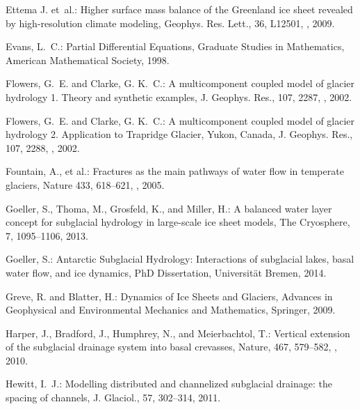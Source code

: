 \documentclass[gmd]{copernicus}   %
\begin{document}
\begin{thebibliography}{68}
Ettema J. et~al.: Higher surface mass balance of the Greenland ice sheet
  revealed by high-resolution climate modeling, Geophys. Res. Lett., 36, L12501,
  , 2009.

Evans, L.~C.: Partial {D}ifferential {E}quations, Graduate Studies in
  Mathematics, American Mathematical Society, 1998.

Flowers, G.~E. and Clarke, G. K.~C.: A multicomponent coupled model of glacier
  hydrology 1. {T}heory and synthetic examples, J. Geophys. Res., 107, 2287,
  , 2002{}.

Flowers, G.~E. and Clarke, G. K.~C.: A multicomponent coupled model of glacier
  hydrology 2. {A}pplication to {T}rapridge {G}lacier, {Y}ukon, {C}anada, J.
  Geophys. Res., 107, 2288, , 2002{}.

Fountain, A., et al.: Fractures as the main pathways of water flow in temperate glaciers, Nature 433, 618--621, , 2005.

Goeller, S., Thoma, M., Grosfeld, K., and Miller, H.: A balanced water layer
  concept for subglacial hydrology in large-scale ice sheet models, The
  Cryosphere, 7, 1095--1106, 2013.

Goeller, S.: Antarctic {S}ubglacial {H}ydrology: {I}nteractions of subglacial lakes, basal water flow, and ice dynamics, PhD Dissertation, Universit\"at Bremen, 2014.

Greve, R. and Blatter, H.: Dynamics of {I}ce {S}heets and {G}laciers, Advances
  in Geophysical and Environmental Mechanics and Mathematics, Springer, 2009.

Harper, J., Bradford, J., Humphrey, N., and Meierbachtol, T.: Vertical
  extension of the subglacial drainage system into basal crevasses, Nature,
  467, 579--582, , 2010.

Hewitt, I.~J.: Modelling distributed and channelized subglacial drainage: the
  spacing of channels, J. Glaciol., 57, 302--314, 2011.


\end{thebibliography}
\end{document}
